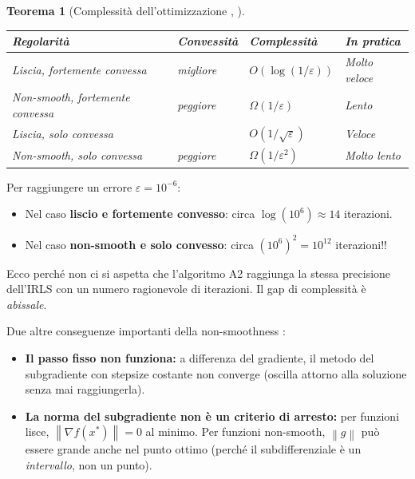 \documentclass[a4paper,11pt]{article}
\newtheorem{theorem}{Teorema}[section]
\theoremstyle{definition}
\newcommand{\norm}[1]{\left\lVert #1 \right\rVert}
\begin{document}
\begin{theorem}[Complessità dell'ottimizzazione {\cite[slide~8, set~5]{opt-slides}, \cite{bubeck2015}}]
\mbox{}
\begin{center}
\begin{tabular}{llll}
\toprule
\textbf{Regolarità} & \textbf{Convessità} & \textbf{Complessità} & \textbf{In pratica} \\
\midrule
Liscia, fortemente convessa & migliore & $O(\log(1/\varepsilon))$ & Molto veloce \\
Non-smooth, fortemente convessa & peggiore & $\Omega(1/\varepsilon)$ & Lento \\
Liscia, solo convessa & & $O(1/\sqrt{\varepsilon})$ & Veloce \\
Non-smooth, solo convessa & peggiore & $\Omega(1/\varepsilon^2)$ & Molto lento \\
\bottomrule
\end{tabular}
\end{center}
\end{theorem}

\begin{analogia}
Per raggiungere un errore $\varepsilon = 10^{-6}$:
\begin{itemize}[nosep]
  \item Nel caso \textbf{liscio e fortemente convesso}: circa $\log(10^6) \approx 14$ iterazioni.
  \item Nel caso \textbf{non-smooth e solo convesso}: circa $(10^6)^2 = 10^{12}$ iterazioni!!
\end{itemize}
Ecco perché non ci si aspetta che l'algoritmo A2 raggiunga la stessa precisione dell'IRLS con un numero ragionevole di iterazioni. Il gap di complessità è \emph{abissale}.
\end{analogia}

Due altre conseguenze importanti della non-smoothness \cite[slide~8--9, set~5]{opt-slides}:
\begin{itemize}
  \item \textbf{Il passo fisso non funziona:} a differenza del gradiente, il metodo del subgradiente con stepsize costante non converge (oscilla attorno alla soluzione senza mai raggiungerla).
  \item \textbf{La norma del subgradiente non è un criterio di arresto:} per funzioni lisce, $\norm{\nabla f(x^*)} = 0$ al minimo. Per funzioni non-smooth, $\norm{g}$ può essere grande anche nel punto ottimo (perché il subdifferenziale è un \emph{intervallo}, non un punto).
\end{itemize}
\end{document}
